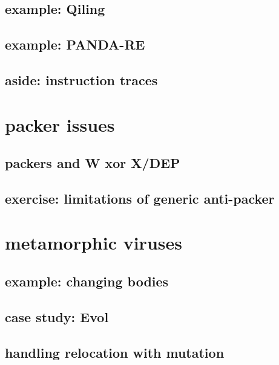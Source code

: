 \subsection{example: Qiling}

\subsection{example: PANDA-RE}


\subsection{aside: instruction traces}


\section{packer issues}
\subsection{packers and W xor X/DEP}


\subsection{exercise: limitations of generic anti-packer}


\section{metamorphic viruses}


\subsection{example: changing bodies}


\subsection{case study: Evol}


\subsection{handling relocation with mutation}


